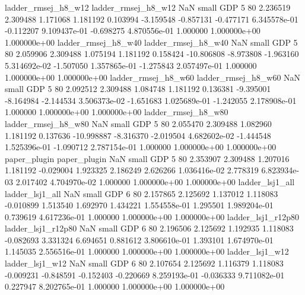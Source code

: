      ladder_rmsej_h8_w12      ladder_rmsej_h8_w12                   NaN      small      GDP                 5 80 2.236519       2.309488 1.171068       1.181192    0.103994     -3.159548     -0.857131    -0.477171   6.345578e-01 -0.112207 9.109437e-01    -0.698275   4.870556e-01            1.000000    1.000000e+00        1.000000e+00
     ladder_rmsej_h8_w40      ladder_rmsej_h8_w40                   NaN      small      GDP                 5 80 2.059906       2.309488 1.075194       1.181192    0.158424    -10.806808     -8.973808    -1.963160   5.314692e-02 -1.507050 1.357865e-01    -1.275843   2.057497e-01            1.000000    1.000000e+00        1.000000e+00
     ladder_rmsej_h8_w60      ladder_rmsej_h8_w60                   NaN      small      GDP                 5 80 2.092512       2.309488 1.084748       1.181192    0.136381     -9.395001     -8.164984    -2.144534   3.506373e-02 -1.651683 1.025689e-01    -1.242055   2.178908e-01            1.000000    1.000000e+00        1.000000e+00
     ladder_rmsej_h8_w80      ladder_rmsej_h8_w80                   NaN      small      GDP                 5 80 2.055470       2.309488 1.082960       1.181192    0.137636    -10.998887     -8.316370    -2.019504   4.682602e-02 -1.444548 1.525396e-01    -1.090712   2.787154e-01            1.000000    1.000000e+00        1.000000e+00
            paper_plugin             paper_plugin                   NaN      small      GDP                 5 80 2.353907       2.309488 1.207016       1.181192   -0.029004      1.923325      2.186249     2.626266   1.036416e-02  2.778319 6.823934e-03     2.017402   4.704970e-02            1.000000    1.000000e+00        1.000000e+00
         ladder_lsj1_all          ladder_lsj1_all                   NaN      small      GDP                 6 80 2.157865       2.125692 1.137012       1.118083   -0.010899      1.513540      1.692970     1.434221   1.554558e-01  1.295501 1.989204e-01     0.739619   4.617236e-01            1.000000    1.000000e+00        1.000000e+00
      ladder_lsj1_r12p80       ladder_lsj1_r12p80                   NaN      small      GDP                 6 80 2.196506       2.125692 1.192935       1.118083   -0.082693      3.331324      6.694651     0.881612   3.806610e-01  1.393101 1.674970e-01     1.145035   2.556516e-01            1.000000    1.000000e+00        1.000000e+00
         ladder_lsj1_w12          ladder_lsj1_w12                   NaN      small      GDP                 6 80 2.107654       2.125692 1.116379       1.118083   -0.009231     -0.848591     -0.152403    -0.220669   8.259193e-01 -0.036333 9.711082e-01     0.227947   8.202765e-01            1.000000    1.000000e+00        1.000000e+00
